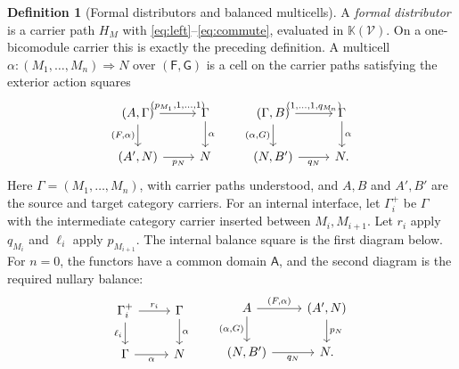 \documentclass[11pt,a4paper]{article}
\theoremstyle{definition}
\newtheorem{definition}[theorem]{Definition}
\theoremstyle{remark}
\numberwithin{equation}{section}
\newcommand{\V}{\mathcal V}
\newcommand{\Kcal}{\mathbb K}
\newcommand{\cell}{\mathrel{\Longrightarrow}}
\begin{document}
\begin{definition}[Formal distributors and balanced multicells]\label{def:formal-distributor}
A \emph{formal distributor} is a carrier path $H_M$ with
\eqref{eq:left}--\eqref{eq:commute}, evaluated in $\Kcal(\V)$. On a
one-bicomodule carrier this is exactly the preceding definition. A
multicell $\alpha:(M_1,\ldots,M_n)\cell N$ over $(\mathsf F,\mathsf G)$
is a cell on the carrier paths satisfying
the exterior action squares
\[
\begin{tikzcd}[column sep=2.5em]
(A,\Gamma) \arrow[r,"{(p_{M_1},1,\ldots,1)}"]
  \arrow[d,"{(F,\alpha)}"'] &
\Gamma \arrow[d,"\alpha"]\\
(A',N) \arrow[r,"p_N"'] & N
\end{tikzcd}
\qquad
\begin{tikzcd}[column sep=2.5em]
(\Gamma,B) \arrow[r,"{(1,\ldots,1,q_{M_n})}"]
  \arrow[d,"{(\alpha,G)}"'] &
\Gamma \arrow[d,"\alpha"]\\
(N,B') \arrow[r,"q_N"'] & N.
\end{tikzcd}
\]
Here $\Gamma=(M_1,\ldots,M_n)$, with carrier paths understood, and
$A,B$ and $A',B'$ are the source and target category carriers.
For an internal interface, let $\Gamma_i^+$ be $\Gamma$ with the
intermediate category carrier inserted between $M_i,M_{i+1}$.
Let $r_i$ apply $q_{M_i}$ and $\ell_i$ apply $p_{M_{i+1}}$.
The internal balance square is the first diagram below. For $n=0$,
the functors have a common domain $\mathsf A$, and the second diagram
is the required nullary balance:
\[
\begin{tikzcd}
\Gamma_i^+ \arrow[r,"r_i"] \arrow[d,"\ell_i"'] &
\Gamma \arrow[d,"\alpha"]\\
\Gamma \arrow[r,"\alpha"'] & N
\end{tikzcd}
\qquad
\begin{tikzcd}
A \arrow[r,"{(F,\alpha)}"] \arrow[d,"{(\alpha,G)}"'] &
(A',N) \arrow[d,"p_N"]\\
(N,B') \arrow[r,"q_N"'] & N.
\end{tikzcd}
\]

\end{definition}
\end{document}
